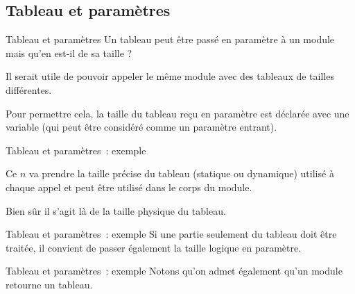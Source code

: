 \subsection{Tableau et paramètres}

\begin{frame}{Tableau et paramètres}
	Un tableau peut être passé en paramètre à un module mais qu’en est-il de
	sa taille ? 
	
	Il serait utile de pouvoir appeler le même module avec des
	tableaux de tailles différentes. 
	
	Pour permettre cela, la taille du
	tableau reçu en paramètre est déclarée avec une variable (qui peut être
	considéré comme un paramètre entrant).
\end{frame}

\begin{frame}{Tableau et paramètres~: exemple}
	
	\bigskip

	Ce $n$ va prendre la taille précise du tableau
	(statique ou dynamique) utilisé à chaque appel et peut être utilisé
	dans le corps du module. 
	
	Bien sûr il s’agit là de la taille physique du tableau.
\end{frame}

\begin{frame}{Tableau et paramètres~: exemple}
	Si une partie seulement du tableau doit être traitée, il
	convient de passer également la taille logique en paramètre.
	
\end{frame}

\begin{frame}{Tableau et paramètres~: exemple}
	Notons qu’on admet également qu’un module retourne un tableau. 
	
	\bigskip
	
\end{frame}



